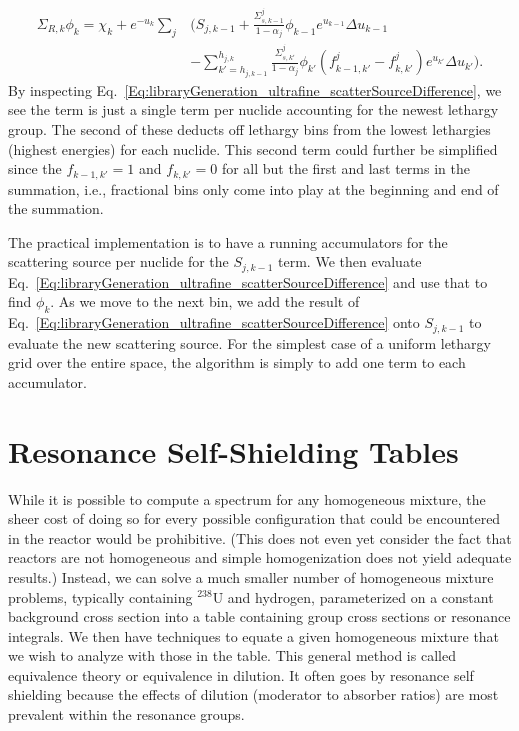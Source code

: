 \begin{align}
  \Sigma_{R,k} \phi_k = \chi_k + e^{-u_k} \sum_j &\bigg(  S_{j,k-1} + \frac{ \Sigma_{s,k-1}^j }{ 1 - \alpha_j } \phi_{k-1} e^{u_{k-1}} \Delta u_{k-1}  \nonumber \\
   &- \sum_{k'=h_{j,k-1}}^{h_{j,k}} \frac{ \Sigma_{s,k'}^j }{ 1 - \alpha_j } \phi_{k'} ( f_{k-1,k'}^j - f_{k,k'}^j ) e^{u_{k'}} \Delta u_{k'} \bigg) .
\end{align}
By inspecting Eq.~\eqref{Eq:libraryGeneration_ultrafine_scatterSourceDifference}, we see the term is just a single term per nuclide accounting for the newest lethargy group. The second of these deducts off lethargy bins from the lowest lethargies (highest energies) for each nuclide. This second term could further be simplified since the $f_{k-1,k'} = 1$ and $f_{k,k'} = 0$ for all but the first and last terms in the summation, i.e., fractional bins only come into play at the beginning and end of the summation.

The practical implementation is to have a running accumulators for the scattering source per nuclide for the $S_{j,k-1}$ term. We then evaluate Eq.~\eqref{Eq:libraryGeneration_ultrafine_scatterSourceDifference} and use that to find $\phi_k$. As we move to the next bin, we add the result of  Eq.~\eqref{Eq:libraryGeneration_ultrafine_scatterSourceDifference} onto $S_{j,k-1}$ to evaluate the new scattering source. For the simplest case of a uniform lethargy grid over the entire space, the algorithm is simply to add one term to each accumulator.





\section{Resonance Self-Shielding Tables}

While it is possible to compute a spectrum for any homogeneous mixture, the sheer cost of doing so for every possible configuration that could be encountered in the reactor would be prohibitive. (This does not even yet consider the fact that reactors are not homogeneous and simple homogenization does not yield adequate results.)  Instead, we can solve a much smaller number of homogeneous mixture problems, typically containing $^{238}$U and hydrogen, parameterized on a constant background cross section into a table containing group cross sections or resonance integrals. We then have techniques to equate a given homogeneous mixture that we wish to analyze with those in the table. This general method is called equivalence theory or equivalence in dilution. It often goes by resonance self shielding because the effects of dilution (moderator to absorber ratios) are most prevalent within the resonance groups.


